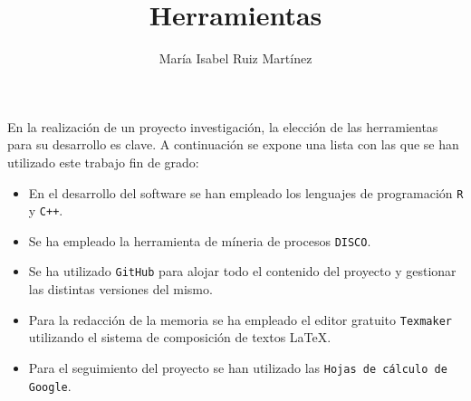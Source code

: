 \documentclass[10pt,a4paper]{article}
\author{María Isabel Ruiz Martínez}
\title{Herramientas}
\begin{document}
\maketitle

En la realización de un proyecto investigación, la elección de las herramientas para su desarrollo es clave. A continuación se expone una lista con las que se han utilizado este trabajo fin de grado:

\begin{itemize}
	\item En el desarrollo del software se han empleado los lenguajes de
programación \texttt{R} y \texttt{C++}.
	\item Se ha empleado la herramienta de míneria de procesos \texttt{DISCO}.
	\item Se ha utilizado \texttt{GitHub} para alojar todo el 			contenido del proyecto y gestionar las distintas versiones del mismo.
	\item Para la redacción de la memoria se ha empleado el editor gratuito \texttt{Texmaker} utilizando el sistema de composición de textos \LaTeX.
	\item Para el seguimiento del proyecto se han utilizado las \texttt{Hojas de cálculo de Google}.
\end{itemize}
\end{document}
